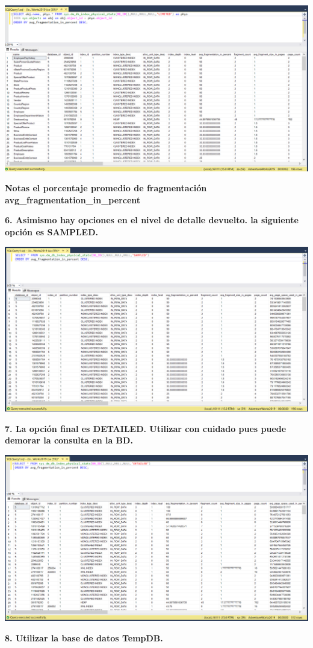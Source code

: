 \documentclass{article}
\begin{document}
   \begin{center}
		\includegraphics[width=15cm]{./images/8} 
	\end{center}

\textbf{Notas el porcentaje promedio de fragmentación avg_fragmentation_in_percent}

\newpage
\textbf{6. Asimismo hay opciones en el nivel de detalle devuelto. la siguiente opción es SAMPLED.}

    \begin{center}
		\includegraphics[width=15cm]{./images/9} 
	\end{center}
	
	\newpage
\textbf{7. La opción final es DETAILED. Utilizar con cuidado pues puede demorar la consulta en la BD.}

    \begin{center}
		\includegraphics[width=15cm]{./images/10} 
	\end{center}
	\newpage
\textbf{8. Utilizar la base de datos TempDB.}
\end{document}
